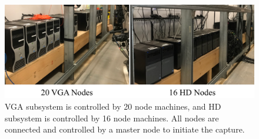 \begin{figure}[t]
	\centering       
	\includegraphics[trim=0 0 0 0,clip,width=\linewidth]{fig_system/machines}
	\caption{VGA subsystem is controlled by 20 node machines, and HD subsystem is controlled by 16 node machines. All nodes are connected and controlled by a master node to initiate the capture.}
	\label{fig:dome_machines}
\end{figure}

